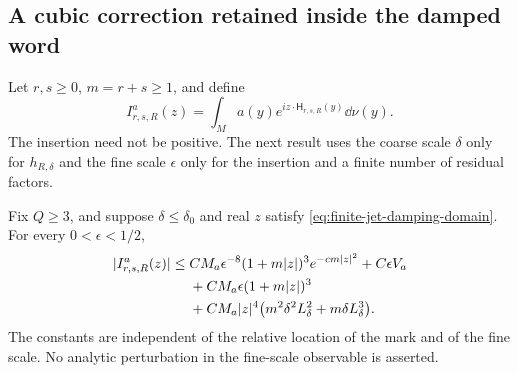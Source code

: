 \subsection{A cubic correction retained inside the damped word}
Let $r,s\ge0$, $m=r+s\ge1$, and define
\[
 I_{r,s,R}^a(z)=\int_M a(y)
                         e^{iz\cdot\mathsf H_{r,s,R}(y)}\dd\nu(y).
\]
The insertion need not be positive. The next result uses the coarse
scale $\delta$ only for $h_{R,\delta}$ and the fine scale $\epsilon$
only for the insertion and a finite number of residual factors.

\begin{theorem}
\label{thm:damped-cubic-unsmoothing}
Fix $Q\ge3$, and suppose $\delta\le\delta_0$ and real $z$ satisfy
\eqref{eq:finite-jet-damping-domain}. For every $0<\epsilon<1/2$,
\begin{align}
 |I_{r,s,R}^a(z)|\le{}&
 CM_a\epsilon^{-8}(1+m|z|)^3e^{-cm|z|^2}+C\epsilon V_a\notag\\
 &+CM_a\epsilon(1+m|z|)^3\notag\\
 &+CM_a|z|^4\bigl(m^2\delta^2L_\delta^2
                              +m\delta L_\delta^3\bigr).
 \label{eq:damped-cubic-unsmoothing}
\end{align}
The constants are independent of the relative location of the mark
and of the fine scale. No analytic perturbation in the fine-scale
observable is asserted.
\end{theorem}

